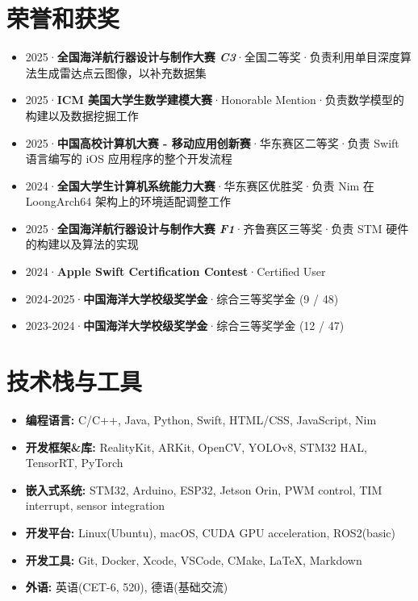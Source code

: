 \documentclass{resume}
\begin{document}
\vspace{0.8em}

\section{荣誉和获奖}\vspace{0.5em}
\begin{itemize}
  \item 2025·\textbf{全国海洋航行器设计与制作大赛 \textit{C3}}·全国二等奖·负责利用单目深度算法生成雷达点云图像，以补充数据集
  \item 2025·\textbf{ICM 美国大学生数学建模大赛}·Honorable Mention·负责数学模型的构建以及数据挖掘工作
  \item 2025·\textbf{中国高校计算机大赛 - 移动应用创新赛}·华东赛区二等奖·负责 Swift 语言编写的 iOS 应用程序的整个开发流程
  \item 2024·\textbf{全国大学生计算机系统能力大赛}·华东赛区优胜奖·负责 Nim 在 LoongArch64 架构上的环境适配调整工作
  \item 2025·\textbf{全国海洋航行器设计与制作大赛 \textit{F1}}·齐鲁赛区三等奖·负责 STM 硬件的构建以及算法的实现
  \item 2024·\textbf{Apple Swift Certification Contest}·Certified User
  \item 2024-2025·\textbf{中国海洋大学校级奖学金}·综合三等奖学金 (9 / 48)
  \item 2023-2024·\textbf{中国海洋大学校级奖学金}·综合三等奖学金 (12 / 47)
\end{itemize}

\vspace{0.8em}

\section{技术栈与工具}\vspace{0.5em}
\begin{itemize}
  \item \textbf{编程语言: }C/C++, Java, Python, Swift, HTML/CSS, JavaScript, Nim
  \item \textbf{开发框架\&库: }RealityKit, ARKit, OpenCV, YOLOv8, STM32 HAL, TensorRT, PyTorch
  \item \textbf{嵌入式系统: }STM32, Arduino, ESP32, Jetson Orin, PWM control, TIM interrupt, sensor integration
  \item \textbf{开发平台: }Linux(Ubuntu), macOS, CUDA GPU acceleration, ROS2(basic)
  \item \textbf{开发工具: }Git, Docker, Xcode, VSCode, CMake, LaTeX, Markdown
  \item \textbf{外语: }英语(CET-6, 520), 德语(基础交流)
\end{itemize}
\end{document}

